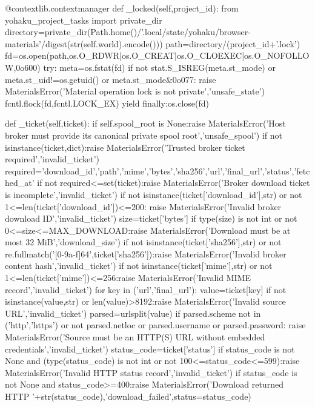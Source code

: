     @contextlib.contextmanager
    def _locked(self,project_id):
        from yohaku_project_tasks import private_dir
        directory=private_dir(Path.home()/'.local/state/yohaku/browser-materials'/digest(str(self.world).encode()))
        path=directory/(project_id+'.lock')
        fd=os.open(path,os.O_RDWR|os.O_CREAT|os.O_CLOEXEC|os.O_NOFOLLOW,0o600)
        try:
            meta=os.fstat(fd)
            if not stat.S_ISREG(meta.st_mode) or meta.st_uid!=os.getuid() or meta.st_mode&0o077:
                raise MaterialsError('Material operation lock is not private','unsafe_state')
            fcntl.flock(fd,fcntl.LOCK_EX)
            yield
        finally:os.close(fd)

    def _ticket(self,ticket):
        if self.spool_root is None:raise MaterialsError('Host broker must provide its canonical private spool root','unsafe_spool')
        if not isinstance(ticket,dict):raise MaterialsError('Trusted broker ticket required','invalid_ticket')
        required={'download_id','path','mime','bytes','sha256','url','final_url','status','fetched_at'}
        if not required<=set(ticket):raise MaterialsError('Broker download ticket is incomplete','invalid_ticket')
        if not isinstance(ticket['download_id'],str) or not 1<=len(ticket['download_id'])<=200:
            raise MaterialsError('Invalid broker download ID','invalid_ticket')
        size=ticket['bytes']
        if type(size) is not int or not 0<=size<=MAX_DOWNLOAD:raise MaterialsError('Download must be at most 32 MiB','download_size')
        if not isinstance(ticket['sha256'],str) or not re.fullmatch('[0-9a-f]{64}',ticket['sha256']):raise MaterialsError('Invalid broker content hash','invalid_ticket')
        if not isinstance(ticket['mime'],str) or not 1<=len(ticket['mime'])<=256:raise MaterialsError('Invalid MIME record','invalid_ticket')
        for key in ('url','final_url'):
            value=ticket[key]
            if not isinstance(value,str) or len(value)>8192:raise MaterialsError('Invalid source URL','invalid_ticket')
            parsed=urlsplit(value)
            if parsed.scheme not in ('http','https') or not parsed.netloc or parsed.username or parsed.password:
                raise MaterialsError('Source must be an HTTP(S) URL without embedded credentials','invalid_ticket')
        status_code=ticket['status']
        if status_code is not None and (type(status_code) is not int or not 100<=status_code<=599):raise MaterialsError('Invalid HTTP status record','invalid_ticket')
        if status_code is not None and status_code>=400:raise MaterialsError('Download returned HTTP '+str(status_code),'download_failed',status=status_code)
